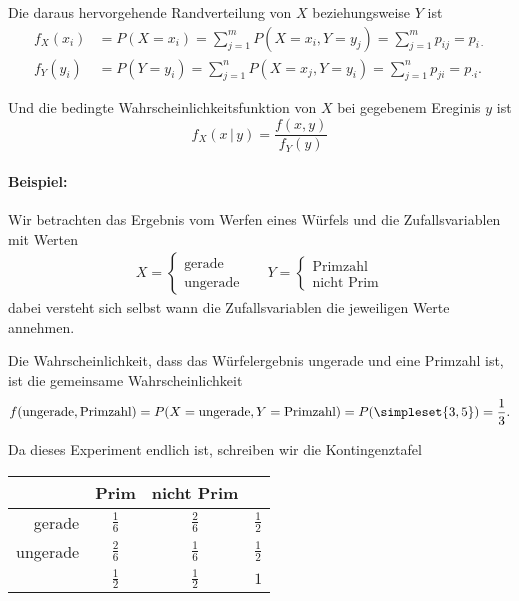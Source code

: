 Die daraus hervorgehende Randverteilung von $X$ beziehungsweise $Y$ ist
\begin{align*}
	f_X(x_i)&=P(X=x_i)=\sum_{j=1}^m P(X=x_i, Y=y_j)=\sum_{j=1}^m p_{ij}=p_{i\cdot}\\
	f_Y(y_i)&=P(Y=y_i)=\sum_{j=1}^n P(X=x_j, Y=y_i)=\sum_{j=1}^n p_{ji}=p_{\cdot i}.
\end{align*}

Und die bedingte Wahrscheinlichkeitsfunktion von $X$ bei gegebenem Ereginis $y$ ist
\begin{equation*}
	f_X(x\,|\,y)=\frac{f(x,y)}{f_Y(y)}
\end{equation*}

\paragraph{Beispiel:}
Wir betrachten das Ergebnis vom Werfen eines Würfels und die Zufallsvariablen mit Werten
\begin{align*}
	X=\begin{cases}
	\text{gerade}\\
	\text{ungerade}
	\end{cases}&&
	Y=\begin{cases}
	\text{Primzahl}\\
	\text{nicht Prim}
	\end{cases}
\end{align*}
dabei versteht sich selbst wann die Zufallsvariablen die jeweiligen Werte annehmen.

Die Wahrscheinlichkeit, dass das Würfelergebnis ungerade und eine Primzahl ist, ist die gemeinsame Wahrscheinlichkeit
\begin{equation*}
	f(\text{ungerade}, \text{Primzahl})=P(X=\text{ungerade},Y=\text{Primzahl})=P(\simpleset{3,5})=\frac13.
\end{equation*}

Da dieses Experiment endlich ist, schreiben wir die Kontingenztafel
\renewcommand{\arraystretch}{1.4}
\begin{center}
	\begin{tabular}{r|cc|l}
		&Prim&nicht Prim&\\\hline
		gerade&$\frac16$&$\frac26$&$\frac12$\\
		ungerade&$\frac26$&$\frac16$&$\frac12$\\\hline
		&$\frac12$&$\frac12$&$1$\\
	\end{tabular}
\end{center}

